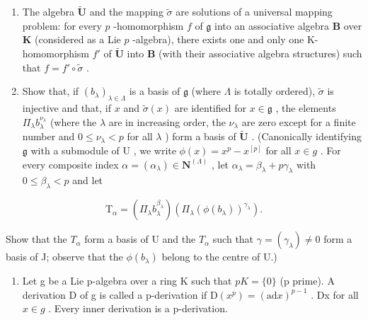 \begin{enumerate}
\def\labelenumi{(\alph{enumi})}
\item
  The algebra \(\tilde{\mathbf{U}}\) and the mapping \(\tilde{\sigma}\) are solutions of a universal mapping problem: for every \(p\) -homomorphism \(f\) of \(\mathfrak{g}\) into an associative algebra \(\mathbf{B}\) over \(\mathbf{K}\) (considered as a Lie \(p\) -algebra), there exists one and only one K-homomorphism \(f'\) of \(\tilde{\mathbf{U}}\) into \(\mathbf{B}\) (with their associative algebra structures) such that \(f = f' \circ \tilde{\sigma}\) .
\item
  Show that, if \((b_{\lambda})_{\lambda \in \Lambda}\) is a basis of \(\mathfrak{g}\) (where \(\Lambda\) is totally ordered), \(\tilde{\sigma}\) is injective and that, if \(x\) and \(\tilde{\sigma}(x)\) are identified for \(x\in \mathfrak{g}\) , the elements \(\Pi_{\lambda}b_{\lambda}^{\nu_{\lambda}}\) (where the \(\lambda\) are in increasing order, the \(\nu_{\lambda}\) are zero except for a finite number and \(0\leqslant \nu_{\lambda} < p\) for all \(\lambda\) ) form a basis of \(\tilde{\mathbf{U}}\) . (Canonically identifying \(\mathfrak{g}\) with a submodule of \(\mathrm{U}\) , we write \(\phi (x) = x^{p} - x^{[p]}\) for all \(x\in g\) . For every composite index \(\alpha = (\alpha_{\lambda})\in \mathbf{N}^{(\Lambda)}\) , let \(\alpha_{\lambda} = \beta_{\lambda} + p\gamma_{\lambda}\) with \(0\leqslant \beta_{\lambda} < p\) and let
\end{enumerate}

\[
\mathrm{T} _ {\alpha} = (\Pi_ {\lambda} b _ {\lambda} ^ {\beta_ {\lambda}}) (\Pi_ {\lambda} (\phi (b _ {\lambda})) ^ {\gamma_ {\lambda}}).
\]

Show that the \(T_{\alpha}\) form a basis of U and the \(T_{\alpha}\) such that \(\gamma = (\gamma_{\lambda}) \neq 0\) form a basis of J; observe that the \(\phi(b_{\lambda})\) belong to the centre of U.)

\begin{enumerate}
\def\labelenumi{\arabic{enumi}.}
\setcounter{enumi}{6}
\tightlist
\item
  Let g be a Lie p-algebra over a ring K such that \(pK = \{0\}\) (p prime). A derivation D of g is called a p-derivation if \(\mathrm{D}(x^{p}) = (\mathrm{ad} x)^{p-1}\) . Dx for all \(x \in g\) . Every inner derivation is a p-derivation.
\end{enumerate}

